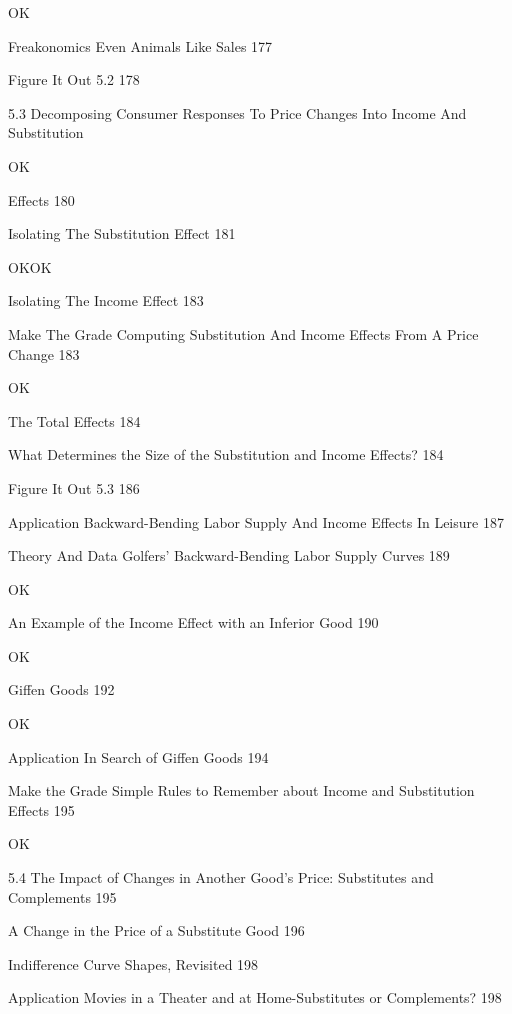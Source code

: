 OK

Freakonomics Even Animals Like Sales 177



Figure It Out 5.2 178



5.3 Decomposing Consumer Responses To Price Changes Into Income And Substitution

OK

Effects 180



Isolating The Substitution Effect 181

OKOK

Isolating The Income Effect 183



Make The Grade Computing Substitution And Income Effects From A Price Change 183

OK

The Total Effects 184



What Determines the Size of the Substitution and Income Effects? 184



Figure It Out 5.3 186



Application Backward-Bending Labor Supply And Income Effects In Leisure 187



Theory And Data Golfers' Backward-Bending Labor Supply Curves 189

OK

An Example of the Income Effect with an Inferior Good 190

OK

Giffen Goods 192

OK

Application In Search of Giffen Goods 194



Make the Grade Simple Rules to Remember about Income and Substitution Effects 195

OK

5.4 The Impact of Changes in Another Good's Price: Substitutes and Complements 195



A Change in the Price of a Substitute Good 196



Indifference Curve Shapes, Revisited 198



Application Movies in a Theater and at Home-Substitutes or Complements? 198

